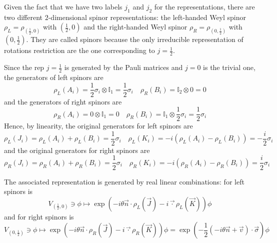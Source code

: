     Given the fact that we have two labels $j_1$ and $j_2$ for the representations, there are two different $2$-dimensional spinor representations: the left-handed Weyl spinor $\rho_L=\rho_{(\frac{1}{2}, 0)}$ with $(\frac{1}{2}, 0)$ and the right-handed Weyl spinor $\rho_R= \rho_{(0, \frac{1}{2})}$ with $(0, \frac{1}{2})$. They are called spinors because the only irreducible representation of rotations restriction are the one corresponding to $j = \frac{1}{2}$.

    Since the rep $j = \frac{1}{2}$ is generated by the Pauli matrices and $j=0$ is the trivial one, the generators of left spinors are 
    \begin{equation*}
        \rho_L(A_i) = \frac{1}{2} \sigma_i \otimes \mathbb I_1 = \frac{1}{2} \sigma_i \quad \rho_R(B_i) = \mathbb I_2 \otimes 0 = 0
    \end{equation*}
    and the generators of right spinors are
    \begin{equation*}
        \rho_R(A_i) = 0 \otimes \mathbb I_1 = 0 \quad \rho_R(B_i) = \mathbb I_1 \otimes \frac{1}{2} \sigma_i = \frac{1}{2} \sigma_i
    \end{equation*}
    Hence, by linearity, the original generators for left spinors are 
    \begin{equation*}
        \rho_L (J_i) = \rho_L(A_i) + \rho_L(B_i) = \frac{1}{2} \sigma_i \quad \rho_L(K_i) = - i (\rho_L(A_i) - \rho_L(B_i)) = - \frac{i}{2} \sigma_i
    \end{equation*}
    and the original generators for right spinors are 
    \begin{equation*}
        \rho_R (J_i) = \rho_R(A_i) + \rho_R(B_i) = \frac{1}{2} \sigma_i \quad \rho_R(K_i) = - i (\rho_R(A_i) - \rho_R(B_i)) = \frac{i}{2} \sigma_i
    \end{equation*}

    The associated representation is generated by real linear combinations: for left spinors is
    \begin{equation*}
        V_{(\frac{1}{2}, 0)} \ni \phi \mapsto \exp(-i \theta \vec n \cdot \rho_L(\vec J) - i \vec \cdot \rho_L(\vec K)) \phi
    \end{equation*}
    and for right spinors is
    \begin{equation*}
        V_{(0, \frac{1}{2})} \ni \phi \mapsto \exp(-i \theta \vec n \cdot \rho_R(\vec J) - i \vec \cdot \rho_R(\vec K)) \phi = \exp(-\frac{1}{2} (- i \theta \vec n + \vec v) \cdot \vec \sigma) \phi
    \end{equation*}

